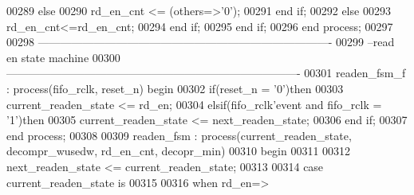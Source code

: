 \begin{DoxyCode}
00289           \textcolor{keywordflow}{else} 
00290             \textcolor{vhdlchar}{rd_en_cnt} \textcolor{vhdlchar}{<=} \textcolor{vhdlchar}{(}\textcolor{keywordflow}{others}\textcolor{vhdlchar}{=}\textcolor{vhdlchar}{>}\textcolor{vhdlchar}{'}\textcolor{vhdllogic}{}\textcolor{vhdllogic}{0}\textcolor{vhdlchar}{'}\textcolor{vhdlchar}{)};
00291           \textcolor{keywordflow}{end} \textcolor{keywordflow}{if};
00292         \textcolor{keywordflow}{else} 
00293           \textcolor{vhdlchar}{rd_en_cnt}\textcolor{vhdlchar}{<=}\textcolor{vhdlchar}{rd_en_cnt};
00294         \textcolor{keywordflow}{end} \textcolor{keywordflow}{if};
00295     \textcolor{keywordflow}{end} \textcolor{keywordflow}{if}; 
00296 \textcolor{keywordflow}{end} \textcolor{keywordflow}{process};
00297 
00298 \textcolor{keyword}{-------------------------------------------------------------------------------}
00299 \textcolor{keyword}{--read en state machine}
00300 \textcolor{keyword}{-------------------------------------------------------------------------------}
00301 readen\_fsm\_f : \textcolor{keywordflow}{process}(fifo_rclk, reset_n) \textcolor{keywordflow}{begin}
00302     \textcolor{keywordflow}{if}\textcolor{vhdlchar}{(}\textcolor{vhdlchar}{reset_n} \textcolor{vhdlchar}{=} \textcolor{vhdlchar}{'}\textcolor{vhdllogic}{}\textcolor{vhdllogic}{0}\textcolor{vhdlchar}{'}\textcolor{vhdlchar}{)}\textcolor{keywordflow}{then}
00303         \textcolor{vhdlchar}{current_readen_state} \textcolor{vhdlchar}{<=} \textcolor{vhdlchar}{rd\_en};
00304     \textcolor{keywordflow}{elsif}\textcolor{vhdlchar}{(}\textcolor{vhdlchar}{fifo_rclk}\textcolor{vhdlchar}{'}\textcolor{vhdlkeyword}{event} \textcolor{keywordflow}{and} \textcolor{vhdlchar}{fifo_rclk} \textcolor{vhdlchar}{=} \textcolor{vhdlchar}{'}\textcolor{vhdllogic}{}\textcolor{vhdllogic}{1}\textcolor{vhdlchar}{'}\textcolor{vhdlchar}{)}\textcolor{keywordflow}{then} 
00305         \textcolor{vhdlchar}{current_readen_state} \textcolor{vhdlchar}{<=} \textcolor{vhdlchar}{next_readen_state};
00306     \textcolor{keywordflow}{end} \textcolor{keywordflow}{if}; 
00307 \textcolor{keywordflow}{end} \textcolor{keywordflow}{process};
00308 
00309 readen\_fsm : \textcolor{keywordflow}{process}(current_readen_state, decompr_wusedw, rd_en_cnt, decopr_min)
00310 \textcolor{vhdlkeyword}{begin}
00311   
00312     \textcolor{vhdlchar}{next_readen_state} \textcolor{vhdlchar}{<=} \textcolor{vhdlchar}{current_readen_state};
00313     
00314     \textcolor{keywordflow}{case} \textcolor{vhdlchar}{current_readen_state} \textcolor{keywordflow}{is}
00315 
00316       \textcolor{keywordflow}{when} \textcolor{vhdlchar}{rd\_en}\textcolor{vhdlchar}{=}\textcolor{vhdlchar}{>}

\end{DoxyCode}
